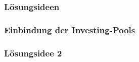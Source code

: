 \newpage
\subsubsection{Lösungsideen}
\vspace{0.3cm}
\subsubsection{Einbindung der Investing-Pools}
\vspace{0.3cm}



\subsubsection{Lösungsidee 2}
\vspace{0.3cm}

